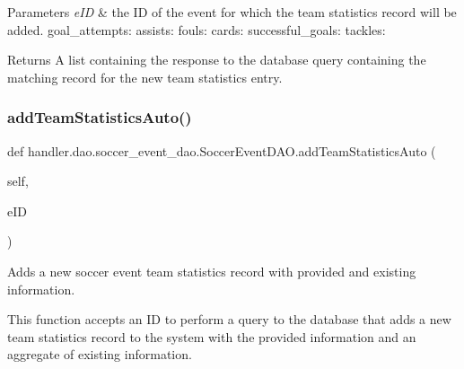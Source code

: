 \begin{DoxyParams}{Parameters}
{\em e\+ID} & the ID of the event for which the team statistics record will be added. goal\+\_\+attempts\+: assists\+: fouls\+: cards\+: successful\+\_\+goals\+: tackles\+:\\
\hline
\end{DoxyParams}
\begin{DoxyReturn}{Returns}
A list containing the response to the database query containing the matching record for the new team statistics entry. 
\end{DoxyReturn}
\mbox{\label{classhandler_1_1dao_1_1soccer__event__dao_1_1_soccer_event_d_a_o_a5e0ab1f0101b17bd786d41d424fd19d9}} 
\subsubsection{\texorpdfstring{add\+Team\+Statistics\+Auto()}{addTeamStatisticsAuto()}}
{\footnotesize\ttfamily def handler.\+dao.\+soccer\+\_\+event\+\_\+dao.\+Soccer\+Event\+D\+A\+O.\+add\+Team\+Statistics\+Auto (\begin{DoxyParamCaption}\item[{}]{self,  }\item[{}]{e\+ID }\end{DoxyParamCaption})}



Adds a new soccer event team statistics record with provided and existing information. 

This function accepts an ID to perform a query to the database that adds a new team statistics record to the system with the provided information and an aggregate of existing information.


